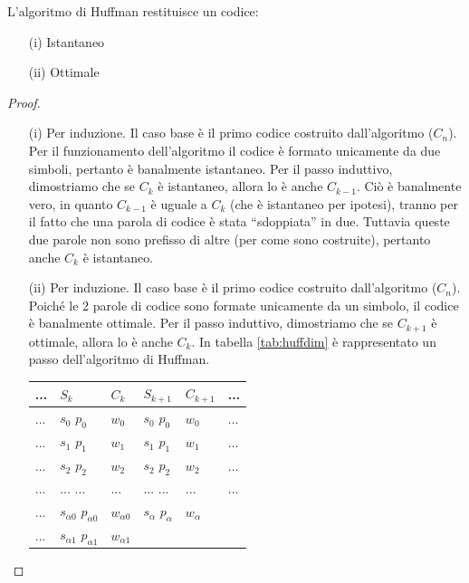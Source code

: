 \begin{teorema}
L'algoritmo di Huffman restituisce un codice:
\begin{itemize}
\item[(i)] Istantaneo
\item[(ii)] Ottimale
\end{itemize}
\begin{proof}
\mbox{}

\begin{itemize}
\item[(i)]
Per induzione.
Il caso base è il primo codice costruito dall'algoritmo ($C_n$). Per il funzionamento dell'algoritmo il codice è formato unicamente da due simboli, pertanto è banalmente istantaneo.
Per il passo induttivo, dimostriamo che se $C_k$ è istantaneo, allora lo è anche $C_{k-1}$.
Ciò è banalmente vero, in quanto $C_{k-1}$ è uguale a $C_k$ (che è istantaneo per ipotesi), tranno per il fatto che una parola di codice è stata ``sdoppiata'' in due. Tuttavia queste due parole non sono prefisso di altre (per come sono costruite), pertanto anche $C_k$ è istantaneo.
\item[(ii)]
Per induzione. Il caso base è il primo codice costruito dall'algoritmo ($C_n$). Poiché le 2 parole di codice sono formate unicamente da un simbolo, il codice è banalmente ottimale. Per il passo induttivo, dimostriamo che se $C_{k+1}$ è ottimale, allora lo è anche $C_{k}$.
In tabella \ref{tab:huffdim} è rappresentato un passo dell'algoritmo di Huffman.

\begin{table}[htbp]
  \begin{center}
   \begin{tabular}{l || l|l|| l|l || l}
	 ... & $S_k$ & $C_k$  & $S_{k+1}$ & $C_{k+1}$ & ...\\
       \hline
	...& $s_0$          $p_0$          & $w_0$ & $s_0$ $p_0$      & $w_0$ & ... \\ 
	...& $s_1$          $p_1$          & $w_1$ & $s_1$ $p_1$      & $w_1$ & ... \\ 
	...& $s_2$          $p_2$          & $w_2$ & $s_2$ $p_2$      & $w_2$ & ...\\
        ...& $...$          ...            & ...   & ...   ...      & ... & ...\\  
        ...& $s_{\alpha 0}$ $p_{\alpha 0}$ & $w_{\alpha 0}$ & $s_{\alpha}$ $p_{\alpha}$ & $w_{\alpha}$ & \\ 
        ...& $s_{\alpha 1}$ $p_{\alpha 1}$ & $w_{\alpha 1}$ &             &  &   \\ 
    \end{tabular}
     

\end{center}
\end{table}
\end{itemize}
\end{proof}
\end{teorema}
